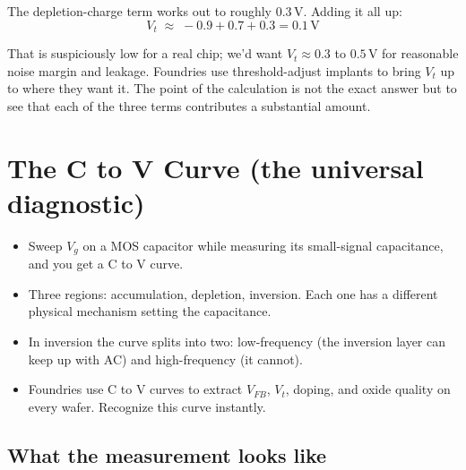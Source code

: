 \documentclass[11pt]{article}
\begin{document}
The depletion-charge term works out to roughly $0.3\,\text{V}$. Adding it all up:
\[
V_t \;\approx\; -0.9 + 0.7 + 0.3 = 0.1\,\text{V}
\]

That is suspiciously low for a real chip; we'd want $V_t \approx 0.3$ to $0.5\,\text{V}$ for reasonable noise margin and leakage. Foundries use threshold-adjust implants to bring $V_t$ up to where they want it. The point of the calculation is not the exact answer but to see that each of the three terms contributes a substantial amount.

\section{The C to V Curve (the universal diagnostic)}

\begin{tldr}
\begin{itemize}[leftmargin=*]
\item Sweep $V_g$ on a MOS capacitor while measuring its small-signal capacitance, and you get a C to V curve.
\item Three regions: accumulation, depletion, inversion. Each one has a different physical mechanism setting the capacitance.
\item In inversion the curve splits into two: low-frequency (the inversion layer can keep up with AC) and high-frequency (it cannot).
\item Foundries use C to V curves to extract $V_{FB}$, $V_t$, doping, and oxide quality on every wafer. Recognize this curve instantly.
\end{itemize}
\end{tldr}

\subsection{What the measurement looks like}
\end{document}
